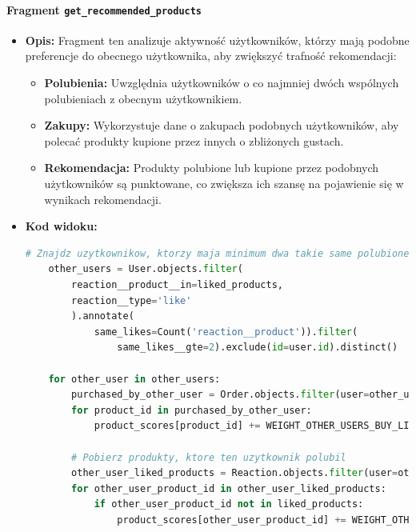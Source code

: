 \documentclass[12pt,a4paper,oneside]{article}
\theoremstyle{definition}
\numberwithin{equation}{section}
\begin{document}
\paragraph{Fragment \texttt{get\_recommended\_products}}
\begin{itemize}
    \item \textbf{Opis:} Fragment ten analizuje aktywność użytkowników, którzy mają podobne preferencje do obecnego użytkownika, aby zwiększyć trafność rekomendacji:
        \begin{itemize}
            \item \textbf{Polubienia:} Uwzględnia użytkowników o co najmniej dwóch wspólnych polubieniach z obecnym użytkownikiem.
            \item \textbf{Zakupy:} Wykorzystuje dane o zakupach podobnych użytkowników, aby polecać produkty kupione przez innych o zbliżonych gustach.
            \item \textbf{Rekomendacja:} Produkty polubione lub kupione przez podobnych użytkowników są punktowane, co zwiększa ich szansę na pojawienie się w wynikach rekomendacji.
        \end{itemize}

    \item \textbf{Kod widoku:}
    \begin{lstlisting}[language=Python, caption=Fragment \texttt{get\_recommended\_products}]
    # Znajdz uzytkownikow, ktorzy maja minimum dwa takie same polubione produkty co uzytkownik
    other_users = User.objects.filter(
        reaction__product__in=liked_products,
        reaction__type='like'
        ).annotate(
            same_likes=Count('reaction__product')).filter(
                same_likes__gte=2).exclude(id=user.id).distinct()

    for other_user in other_users:
        purchased_by_other_user = Order.objects.filter(user=other_user, status='completed').values_list('products', flat=True)
        for product_id in purchased_by_other_user:
            product_scores[product_id] += WEIGHT_OTHER_USERS_BUY_LIKE

        # Pobierz produkty, ktore ten uzytkownik polubil
        other_user_liked_products = Reaction.objects.filter(user=other_user, type='like').values_list('product_id', flat=True)
        for other_user_product_id in other_user_liked_products:
            if other_user_product_id not in liked_products:
                product_scores[other_user_product_id] += WEIGHT_OTHER_USERS_LIKE
        \end{lstlisting}


\end{itemize}
\end{document}

